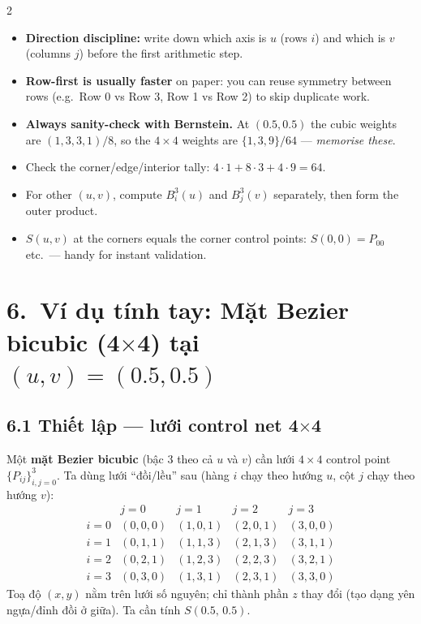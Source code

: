 \begin{paracol}{2}
\begin{itemize}[leftmargin=*,nosep]
  \item \textbf{Direction discipline:} write down which axis is $u$ (rows $i$) and which is $v$ (columns $j$) before the first arithmetic step.
  \item \textbf{Row-first is usually faster} on paper: you can reuse symmetry between rows (e.g.\ Row 0 vs Row 3, Row 1 vs Row 2) to skip duplicate work.
  \item \textbf{Always sanity-check with Bernstein.} At $(0.5,0.5)$ the cubic weights are $(1,3,3,1)/8$, so the $4\times4$ weights are $\{1,3,9\}/64$ --- \emph{memorise these}.
  \item Check the corner/edge/interior tally: $4{\cdot}1+8{\cdot}3+4{\cdot}9=64$.
  \item For other $(u,v)$, compute $B_i^3(u)$ and $B_j^3(v)$ separately, then form the outer product.
  \item $S(u,v)$ at the corners equals the corner control points: $S(0,0)=P_{00}$ etc.\ --- handy for instant validation.
\end{itemize}

\switchcolumn
\section*{6.\ Ví dụ tính tay: Mặt Bezier bicubic (4$\times$4) tại $(u,v)=(0.5,0.5)$}

\subsection*{6.1 Thiết lập --- lưới control net 4$\times$4}

Một \textbf{mặt Bezier bicubic} (bậc 3 theo cả $u$ và $v$) cần lưới $4\times 4$ control point $\{P_{ij}\}_{i,j=0}^{3}$. Ta dùng lưới ``đồi/lều'' sau (hàng $i$ chạy theo hướng $u$, cột $j$ chạy theo hướng $v$):
\[
\renewcommand{\arraystretch}{1.1}
\begin{array}{c|cccc}
 & j=0 & j=1 & j=2 & j=3 \\\hline
i{=}0 & (0,0,0) & (1,0,1) & (2,0,1) & (3,0,0) \\
i{=}1 & (0,1,1) & (1,1,3) & (2,1,3) & (3,1,1) \\
i{=}2 & (0,2,1) & (1,2,3) & (2,2,3) & (3,2,1) \\
i{=}3 & (0,3,0) & (1,3,1) & (2,3,1) & (3,3,0)
\end{array}
\]
Toạ độ $(x,y)$ nằm trên lưới số nguyên; chỉ thành phần $z$ thay đổi (tạo dạng yên ngựa/đỉnh đồi ở giữa). Ta cần tính $S(0.5,\,0.5)$.


\end{paracol}

